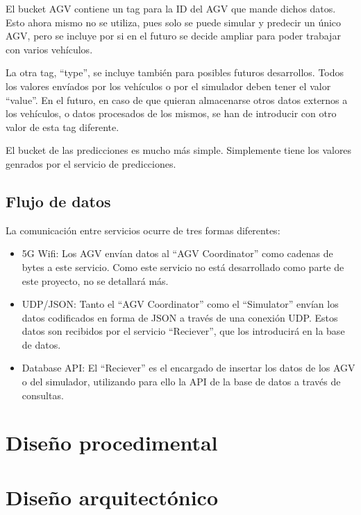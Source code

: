 El bucket AGV contiene un tag para la ID del AGV que mande dichos datos. Esto ahora mismo no se utiliza, pues 
solo se puede simular y predecir un único AGV, pero se incluye por si en el futuro se decide ampliar para poder 
trabajar con varios vehículos. 

La otra tag, ``type'', se incluye también para posibles futuros desarrollos. Todos los valores envíados por los 
vehículos o por el simulador deben tener el valor ``value''. En el futuro, en caso de que quieran almacenarse 
otros datos externos a los vehículos, o datos procesados de los mismos, se han de introducir con otro valor de 
esta tag diferente.


El bucket de las predicciones es mucho más simple. Simplemente tiene los valores genrados por el servicio de 
predicciones.

\subsection{Flujo de datos}

La comunicación entre servicios ocurre de tres formas diferentes:
\begin{itemize}
    \item 5G Wifi: Los AGV envían datos al ``AGV Coordinator'' como cadenas de bytes a este servicio.
        Como este servicio no está desarrollado como parte de este proyecto, no se detallará más.
    \item UDP/JSON: Tanto el ``AGV Coordinator'' como el ``Simulator'' envían los datos codificados en 
        forma de JSON a través de una conexión UDP. Estos datos son recibidos por el servicio ``Reciever'',
        que los introducirá en la base de datos.
    \item Database API: El ``Reciever'' es el encargado de insertar los datos de los AGV o del simulador, 
        utilizando para ello la API de la base de datos a través de consultas.
\end{itemize}

\section{Diseño procedimental}


\section{Diseño arquitectónico}

